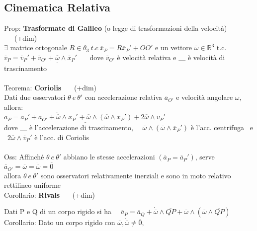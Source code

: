 \documentclass{article}
\begin{document}
\subsection{Cinematica Relativa}
%
%
Prop: \textbf{Trasformate di Galileo} (o legge di trasformazioni della velocità) \ \ \ (+dim)\\
\phantom{\ } $\exists$ matrice ortogonale $R\in\theta_3 \ t.c \ \overline{x}_P = R\overline{x}_P' + \overline{OO'}$ e un vettore $\overline{\omega} \in \mathbb{R}^3$ t.c. \\
\phantom{\ } $\overline{v}_P = \overline{v}_P' + \underline{ \overline{v}_{O'} + \overline{\omega} \wedge \overline{x}_P'}$ \ \ \ dove $\overline{v}_{O'}$  è velocità relativa e \underline{ \ \ }  è velocità di trascinamento \\ \\
%
%
Teorema: \textbf{Coriolis} \ \ \ (+dim)\\
\phantom{\ } Dati due osservatori $\theta \ e \ \theta'$ con accelerazione relativa $\overline{a}_{O'}$ e velocità angolare $\omega$, allora: \\
\phantom{} \hspace{1in} $\overline{a}_P=\overline{a}_P' +  \underline{\overline{a}_{O'} + \dot{\overline{\omega}}\wedge\overline{x}_P' +  \overline{\omega}\wedge(\overline{\omega}\wedge\overline{x}_P')} +  2\overline{\omega}\wedge\overline{v}_P'$ \\
\phantom{\ } dove \underline{ \ \ } è l'accelerazione di trascinamento, \ \ $\overline{\omega}\wedge(\overline{\omega}\wedge\overline{x}_P')$ è l'acc. centrifuga \ e \ $2\overline{\omega}\wedge\overline{v}_P'$ è l'acc. di Coriolis \\ \\
%
%
%
Oss: Affinché $\theta \ e\ \theta'$ abbiano le stesse accelerazioni $(\overline{a}_P = \overline{a}_P')$,  serve \ $\overline{a}_{O'}=\overline{\omega}=\dot{\overline{\omega}}=\overline{0} $ \\
\phantom{Oss: }allora $\theta \ e\ \theta'$ sono osservatori relativamente inerziali e sono in moto relativo rettilineo uniforme \\
%
%
Corollario: \textbf{Rivals} \ \ \ (+dim)

Dati P e Q di un corpo rigido si ha \ \ $\overline{a}_P=\overline{a}_Q + \dot{\overline{\omega}}\wedge\overline{QP} +  \overline{\omega}\wedge(\overline{\omega}\wedge\overline{QP})$ \\
%
%
Corollario: Dato un corpo rigido con $\overline{\omega}, \dot{\overline{\omega}}\neq\overline{0},$
\end{document}
